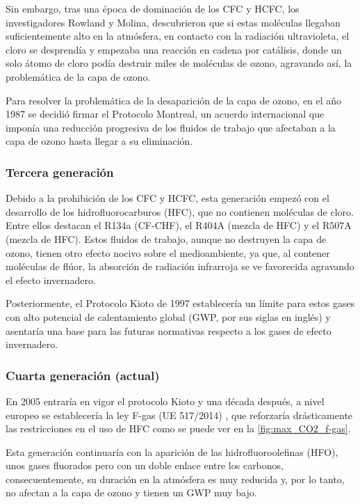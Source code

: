 \documentclass[../main.tex]{subfiles}
\begin{document}
Sin embargo, tras una época de dominación de los CFC y HCFC, los investigadores Rowland y Molina, descubrieron que si estas moléculas llegaban suficientemente alto en la atmósfera, en contacto con la radiación ultravioleta, el cloro se desprendía y empezaba una reacción en cadena por catálisis, donde un solo átomo de cloro podía destruir miles de moléculas de ozono, agravando así, la problemática de la capa de ozono\cite{molina1974stratospheric}.

Para resolver la problemática de la desaparición de la capa de ozono, en el año 1987 se decidió firmar el Protocolo Montreal, un acuerdo internacional que imponía una reducción progresiva de los fluidos de trabajo que afectaban a la capa de ozono hasta llegar a su eliminación.


\subsubsection{Tercera generación}

Debido a la prohibición de los CFC y HCFC, esta generación empezó con el desarrollo de los hidrofluorocarburos (HFC), que no contienen moléculas de cloro. Entre ellos destacan el R134a (CF-CHF), el R404A (mezcla de HFC) y el R507A (mezcla de HFC). Estos fluidos de trabajo, aunque no destruyen la capa de ozono, tienen otro efecto nocivo sobre el medioambiente, ya que, al contener moléculas de flúor, la absorción de radiación infrarroja se ve favorecida agravando el efecto invernadero.

Posteriormente, el Protocolo Kioto de 1997 establecería un límite para estos gases con alto potencial de calentamiento global (GWP, por sus siglas en inglés) y asentaría una base para las futuras normativas respecto a los gases de efecto invernadero.



\subsubsection{Cuarta generación (actual)}

En 2005 entraría en vigor el protocolo Kioto y una década después, a nivel europeo se establecería la ley F-gas (UE 517/2014) \cite{EU2014_517}, que reforzaría drásticamente las restricciones en el uso de HFC como se puede ver en la \autoref{fig:max_CO2_f-gas}.

Esta generación continuaría con la aparición de las hidrofluoroolefinas (HFO), unos gases fluorados pero con un doble enlace entre los carbonos, consecuentemente, su duración en la atmósfera es muy reducida y, por lo tanto, no afectan a la capa de ozono y tienen un GWP muy bajo.
\end{document}
